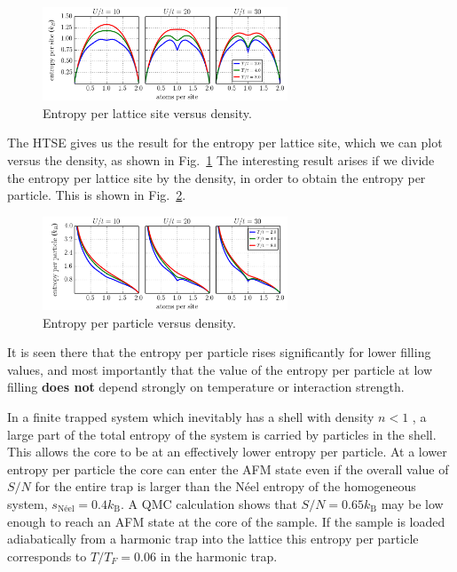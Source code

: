 \documentclass[11pt,letter]{article}
\begin{document}
\begin{figure}
    \centering
    \includegraphics[width=0.65\textwidth]{figures/HTSE_EntropyPerSite_U.png}
    \caption{Entropy per lattice site versus density.}\label{fig:HTSE_spersite}
\end{figure}
The HTSE gives us the result for the entropy per lattice site, which we can
plot versus the density, as shown in Fig.~\ref{fig:HTSE_spersite}  The
interesting result arises if we divide the entropy per lattice site by the
density, in order to obtain the entropy per particle.  This is shown in
Fig.~\ref{fig:HTSE_sperparticle}. 
\begin{figure}
    \centering
    \includegraphics[width=0.65\textwidth]{figures/HTSE_EntropyPerParticle_U.png}
    \caption{Entropy per particle versus density.}\label{fig:HTSE_sperparticle}
\end{figure}
It is seen there that the entropy per particle rises significantly for lower
filling values, and most importantly that the value of the entropy per particle
at low filling \textbf{does not} depend strongly on temperature or interaction
strength.   

In a finite trapped system which inevitably has a shell with density $n<1$ , a
large part of the total entropy of the system is carried by particles in the
shell.  This allows the core to be at an effectively lower entropy per
particle.  At a lower entropy per particle the core can enter the AFM state
even if the overall value of $S/N$ for the entire trap 	is larger than the
N\'{e}el entropy of the homogeneous system,  $s_{\text{N\'{e}el}} = 0.4
k_{\text{B}}$.   A QMC calculation shows that  $S/N=0.65k_{\text{B}}$ may be
low enough to reach an AFM state at the core of the sample.   If the sample is
loaded adiabatically from a harmonic trap into the lattice this entropy per
particle corresponds to $T/T_{F} = 0.06$ in the harmonic trap. 
\end{document}
